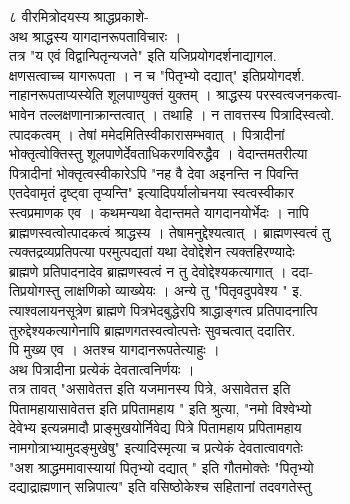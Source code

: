 \documentclass[11pt, openany]{book}
\begin{document}
{{{{{{{{{{{{{{{{{{{{८ }{वीरमित्रोदयस्य श्राद्धप्रकाशे-}{\\
अथ श्राद्धस्य यागदानरूपताविचारः ।\\
तत्र "य एवं विद्वान्पितृन्यजते" इति यजिप्रयोगदर्शनाद्यागल.\\
क्षणसत्वाच्च यागरूपता । न च "पितृभ्यो दद्यात्" इतिप्रयोगदर्श.\\
नाहानरूपताप्यस्येति शूलपाण्युक्तं युक्तम् । श्राद्धस्य
परस्वत्वजनकत्वा-\\
भावेन तल्लक्षणानाक्रान्तत्वात् । तथाहि । न तावत्तस्य पित्रादिस्वत्वो.\\
त्पादकत्वम् । तेषां ममेदमितिस्वीकारासम्भवात् । पित्रादीनां\\
भोक्तृत्वोक्तिस्तु शूलपाणेर्देवताधिकरणविरुद्धैव । वेदान्तमतरीत्या\\
पित्रादीनां भोक्तृत्वस्वीकारेऽपि "नह वै देवा अइनन्ति न पिवन्ति\\
एतदेवामृतं दृष्ट्वा तृप्यन्ति" इत्यादिपर्यालोचनया स्वत्वस्वीकार\\
स्त्वप्रमाणक एव । कथमन्यथा वेदान्तमते यागदानयोर्भेदः । नापि\\
ब्राह्मणस्वत्वोत्पादकत्वं श्राद्धस्य । तेषामनुद्देश्यत्वात् ।
ब्राह्मणस्वत्वं तु\\
त्यक्तद्रव्यप्रतिपत्या परमुत्पद्यतां यथा देवोद्देशेन त्यक्तहिरण्यादेः\\
ब्राह्मणे प्रतिपादनादेव ब्राह्मणस्वत्वं न तु देवोद्देश्यकत्यागात् ।
ददा-\\
तिप्रयोगस्तु लाक्षणिको व्याख्येयः । अन्ये तु "पितृवदुपवेश्य " इ.\\
त्याश्वलायनसूत्रेण ब्राह्मणे पित्रभेदबुद्धेरपि श्राद्धाङ्गत्व
प्रतिपादनात्पि\\
तुरुद्देश्यकत्यागेनापि ब्राह्मणगतस्वत्वोत्पत्तेः सुवचत्वात् ददातिर.\\
पि मुख्य एव । अतश्च यागदानरूपतेत्याहुः ।\\
अथ पित्रादीना प्रत्येकं देवतात्वनिर्णयः ।\\
तत्र तावत् "असावेतत्त इति यजमानस्य पित्रे, असावेतत्त इति\\
पितामहायासावेतत्त इति प्रपितामहाय " इति श्रुत्या, "नमो विश्वेभ्यो\\
देवेभ्य इत्यन्नमादौ प्राङ्मुखयोर्निवेद्य पित्रे पितामहाय प्रपितामहाय\\
नामगोत्राभ्यामुदङ्मुखेषु" इत्यादिस्मृत्या च प्रत्येकं देवतात्वावगतेः\\
"अश श्राद्धममावास्यायां पितृभ्यो दद्यात् " इति गौतमोक्तेः
"पितृभ्यो\\
दद्याद्राह्मणान् सन्निपात्य" इति वसिष्ठोकेश्च सहितानां तदवगतेस्तु\\
}}}}}}}}}}}}}}}}}}}}
\end{document}
